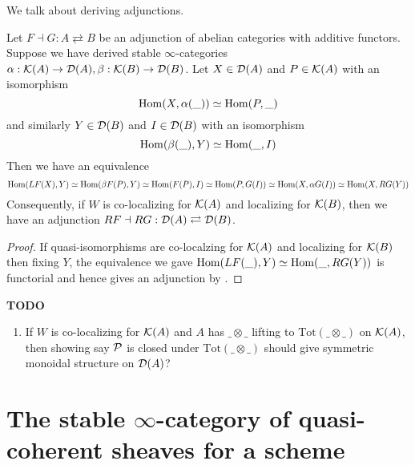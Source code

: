 \documentclass{article}
\begin{document}
We talk about deriving adjunctions.
\begin{prop}
  
  Let $F \dashv G : A \rightleftarrows B$ be
  an adjunction of abelian categories with additive functors.
  Suppose we have derived stable $\infty$-categories
  $\alpha : \mathcal{K}(A) \to \mathcal{D}(A) , \beta : \mathcal{K}(B) \to \mathcal{D}(B)$.
  Let $X \in \mathcal{D}(A)$ and $P \in \mathcal{K}(A)$ with
  an isomorphism \[
    \mathrm{Hom}(X , \alpha(\_)) \simeq \mathrm{Hom}(P , \_)
  \]
  and similarly $Y \in \mathcal{D}(B)$ and $I \in \mathcal{D}(B)$
  with an isomorphism \[
    \mathrm{Hom}(\beta(\_) , Y) \simeq \mathrm{Hom}(\_ , I)
  \]
  Then we have an equivalence \[
    \mathrm{Hom}(LF(X) , Y) \simeq \mathrm{Hom}(\beta F(P) , Y)
    \simeq \mathrm{Hom}(F(P) , I) \simeq \mathrm{Hom}(P , G(I))
    \simeq \mathrm{Hom}(X , \alpha G(I))
    \simeq \mathrm{Hom}(X , RG(Y))
  \]
  Consequently, if $W$ is co-localizing for $\mathcal{K}(A)$ 
  and localizing for $\mathcal{K}(B)$,
  then we have an adjunction $RF \dashv RG : \mathcal{D}(A) \rightleftarrows \mathcal{D}(B)$.
\end{prop}
\begin{proof}
  If quasi-isomorphisms are co-localzing for $\mathcal{K}(A)$
  and localizing for $\mathcal{K}(B)$ then 
  fixing $Y$, the equivalence we gave
  $\mathrm{Hom}(LF(\_ ) , Y) \simeq \mathrm{Hom}(\_ , RG(Y))$ is functorial
  and hence gives an adjunction by 
  \cite[\href{https://kerodon.net/tag/02FX}{Tag 02FX}]{kerodon}.
\end{proof}

\textbf{TODO}
\begin{enumerate}
  \item If $W$ is co-localizing for $\mathcal{K}(A)$
  and $A$ has $\_ \otimes \_$ lifting to $\mathrm{Tot}(\_ \otimes \_)$
  on $\mathcal{K}(A)$,
  then showing say $\mathcal{P}$ is closed under $\mathrm{Tot(\_ \otimes \_)}$
  should give symmetric monoidal structure on $\mathcal{D}(A)$?
\end{enumerate}

\section{The stable $\infty$-category of quasi-coherent sheaves for a scheme}
\end{document}

